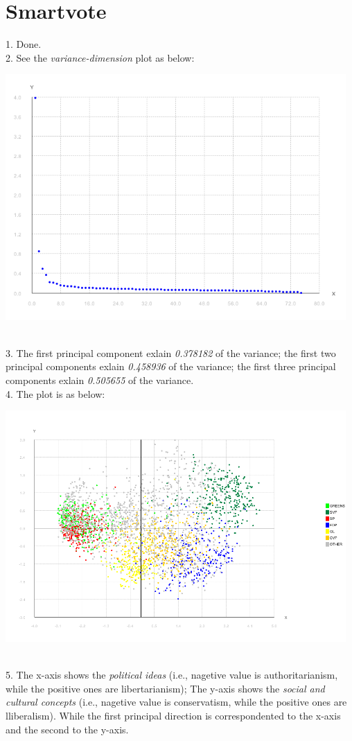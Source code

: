 \documentclass[11pt]{article} %
\begin{document}
\section{Smartvote}
1.  Done.\\
2.  See the \emph{variance-dimension} plot as below:\\
\centerline{
\includegraphics[width=13cm]{pic/p4}}\\
3.  The first principal component exlain \emph{0.378182} of the variance; the first two principal components exlain \emph{0.458936} of the variance; the first three principal components exlain \emph{0.505655} of the variance.\\
4.  The plot is as below: \\
\centerline{
\includegraphics[width=13cm]{pic/p5}}\\
5.  The x-axis shows the \emph{political ideas} (i.e., nagetive value is authoritarianism, while the positive ones are libertarianism);  The y-axis shows the \emph{social and cultural concepts} (i.e., nagetive value is conservatism, while the positive ones are lliberalism). While the first principal direction is correspondented to the x-axis and the second to the y-axis.\\
\end{document}
